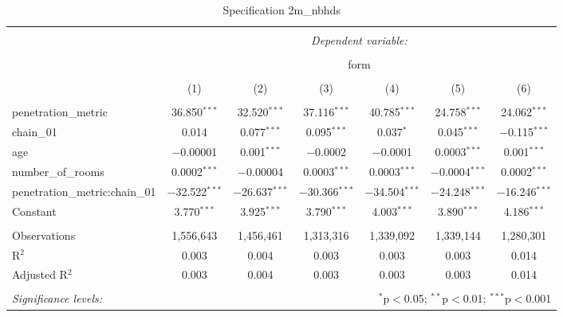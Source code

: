 \begin{table}[!htbp] \centering 
  \caption{Specification 2{m}_nbhds} 
  \label{spec_1} 
\begin{tabular}{@{\extracolsep{5pt}}lcccccc} 
\\[-1.8ex]\hline 
\hline \\[-1.8ex] 
 & \multicolumn{6}{c}{\textit{Dependent variable:}} \\ 
\cline{2-7} 
\\[-1.8ex] & \multicolumn{6}{c}{form} \\ 
\\[-1.8ex] & (1) & (2) & (3) & (4) & (5) & (6)\\ 
\hline \\[-1.8ex] 
 penetration\_metric & 36.850$^{***}$ & 32.520$^{***}$ & 37.116$^{***}$ & 40.785$^{***}$ & 24.758$^{***}$ & 24.062$^{***}$ \\ 
  chain\_01 & 0.014 & 0.077$^{***}$ & 0.095$^{***}$ & 0.037$^{*}$ & 0.045$^{***}$ & $-$0.115$^{***}$ \\ 
  age & $-$0.00001 & 0.001$^{***}$ & $-$0.0002 & $-$0.0001 & 0.0003$^{***}$ & 0.001$^{***}$ \\ 
  number\_of\_rooms & 0.0002$^{***}$ & $-$0.00004 & 0.0003$^{***}$ & 0.0003$^{***}$ & $-$0.0004$^{***}$ & 0.0002$^{***}$ \\ 
  penetration\_metric:chain\_01 & $-$32.522$^{***}$ & $-$26.637$^{***}$ & $-$30.366$^{***}$ & $-$34.504$^{***}$ & $-$24.248$^{***}$ & $-$16.246$^{***}$ \\ 
  Constant & 3.770$^{***}$ & 3.925$^{***}$ & 3.790$^{***}$ & 4.003$^{***}$ & 3.890$^{***}$ & 4.186$^{***}$ \\ 
 \hline \\[-1.8ex] 
Observations & 1,556,643 & 1,456,461 & 1,313,316 & 1,339,092 & 1,339,144 & 1,280,301 \\ 
R$^{2}$ & 0.003 & 0.004 & 0.003 & 0.003 & 0.003 & 0.014 \\ 
Adjusted R$^{2}$ & 0.003 & 0.004 & 0.003 & 0.003 & 0.003 & 0.014 \\ 
\hline 
\hline \\[-1.8ex] 
\textit{Significance levels:}  & \multicolumn{6}{r}{$^{*}$p$<$0.05; $^{**}$p$<$0.01; $^{***}$p$<$0.001} \\ 
\end{tabular} 
\end{table} 
